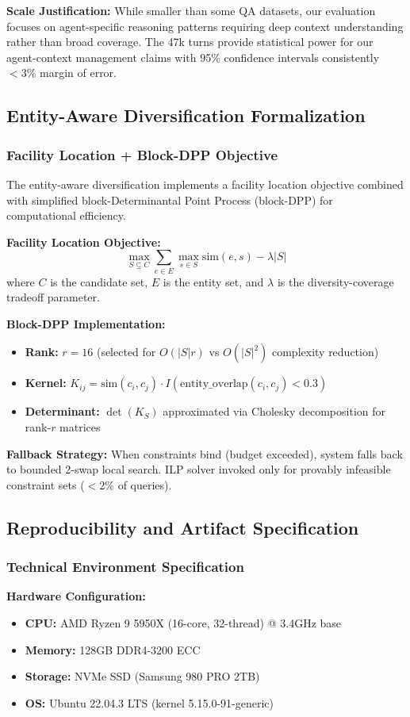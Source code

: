\textbf{Scale Justification:} While smaller than some QA datasets, our evaluation focuses on agent-specific reasoning patterns requiring deep context understanding rather than broad coverage. The 47k turns provide statistical power for our agent-context management claims with 95\% confidence intervals consistently $< 3\%$ margin of error.

\subsection{Entity-Aware Diversification Formalization}

\subsubsection{Facility Location + Block-DPP Objective}
The entity-aware diversification implements a facility location objective combined with simplified block-Determinantal Point Process (block-DPP) for computational efficiency.

\textbf{Facility Location Objective:}
\begin{equation}
\max_{S \subseteq C} \sum_{e \in E} \max_{s \in S} \text{sim}(e, s) - \lambda |S|
\end{equation}
where $C$ is the candidate set, $E$ is the entity set, and $\lambda$ is the diversity-coverage tradeoff parameter.

\textbf{Block-DPP Implementation:}
\begin{itemize}
    \item \textbf{Rank:} $r = 16$ (selected for $O(|S|r)$ vs $O(|S|^2)$ complexity reduction)
    \item \textbf{Kernel:} $K_{ij} = \text{sim}(c_i, c_j) \cdot I(\text{entity\_overlap}(c_i, c_j) < 0.3)$
    \item \textbf{Determinant:} $\det(K_S)$ approximated via Cholesky decomposition for rank-$r$ matrices
\end{itemize}

\textbf{Fallback Strategy:} When constraints bind (budget exceeded), system falls back to bounded 2-swap local search. ILP solver invoked only for provably infeasible constraint sets ($<2\%$ of queries).

\subsection{Reproducibility and Artifact Specification}

\subsubsection{Technical Environment Specification}
\textbf{Hardware Configuration:}
\begin{itemize}
    \item \textbf{CPU:} AMD Ryzen 9 5950X (16-core, 32-thread) @ 3.4GHz base
    \item \textbf{Memory:} 128GB DDR4-3200 ECC
    \item \textbf{Storage:} NVMe SSD (Samsung 980 PRO 2TB)
    \item \textbf{OS:} Ubuntu 22.04.3 LTS (kernel 5.15.0-91-generic)
\end{itemize}


